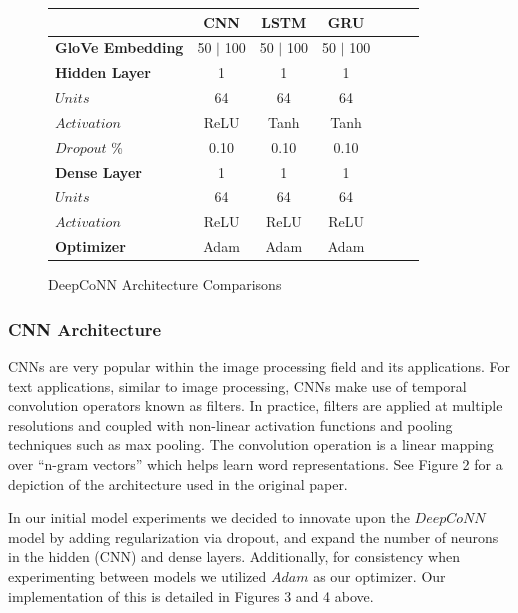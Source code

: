 \documentclass[10pt, twocolumn, letterpaper]{article}
\begin{document}
\begin{figure}[!ht]
\begin{center}
{\small
\begin{tabular}{l|cccccc}
\hline
& \textbf{CNN} & \textbf{LSTM} & \textbf{GRU}  \\
\hline
\textbf{GloVe Embedding} & 50 $|$ 100 & 50 $|$ 100 & 50 $|$ 100 \\
\hline
\textbf{Hidden Layer} & 1 & 1 & 1 \\
$Units$ & 64 & 64 & 64 \\
$Activation$ & ReLU & Tanh &  Tanh \\
$Dropout$ \% & 0.10 & 0.10 & 0.10 & \\
\hline
\textbf{Dense Layer} & 1 & 1 & 1 \\
$Units$ & 64 & 64 &  64 \\
$Activation$ & ReLU & ReLU &  ReLU \\
\hline
\textbf{Optimizer} & Adam & Adam &  Adam \\
\hline

\end{tabular}
}
\end{center}
\caption{DeepCoNN Architecture Comparisons}
\end{figure}

\subsubsection{CNN Architecture}
CNNs are very popular within the image processing field and its applications.
For text applications, similar to image processing, CNNs make use of temporal convolution operators known as filters. In practice, filters are applied at multiple resolutions and coupled with non-linear activation functions
and pooling techniques such as max pooling. The convolution operation is a linear mapping over “n-gram vectors” which helps learn word representations. See Figure 2 for a depiction of the architecture used in the original paper.

In our initial model experiments we decided to innovate upon the $DeepCoNN$ model by adding regularization via dropout, and expand the number of neurons in the hidden (CNN) and dense layers. Additionally, for consistency when experimenting between models we utilized $Adam$ as our optimizer. Our implementation of this is detailed in Figures 3 and 4 above.
\end{document}
